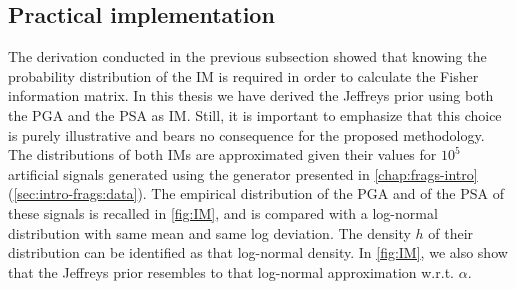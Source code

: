     \subsection{Practical implementation}\label{sec:PREM:subsec-jeffprectical}



    The derivation conducted in the previous subsection showed that knowing the probability distribution of the IM is required in order to calculate the Fisher information matrix. %
    In this thesis we have derived the Jeffreys prior using both the PGA and the PSA as IM.
    {Still, it is important to emphasize that this choice is purely illustrative and bears no consequence for the proposed methodology.} 
    The distributions of both IMs are approximated given their values for $10^5$ artificial signals generated using the generator presented in   \cref{chap:frags-intro} (\cref{sec:intro-frags:data}).
    The empirical distribution of the PGA and of the PSA of these signals is recalled in \cref{fig:IM}, and is compared with a log-normal distribution with same mean and same log deviation. 
    The density $h$ of their distribution can be identified as that log-normal density. 
    In \cref{fig:IM}, we also show that the Jeffreys prior resembles to that log-normal approximation w.r.t. $\alpha$.



